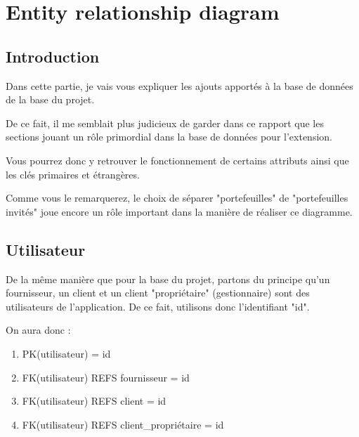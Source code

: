 \section{Entity relationship diagram}
\subsection{Introduction}
\begin{flushleft}
Dans cette partie, je vais vous expliquer les ajouts apportés à la base de données de la base du projet. 
\end{flushleft}
\begin{flushleft}
De ce fait, il me semblait plus judicieux de garder dans ce rapport que les sections jouant un rôle primordial dans la base de données pour l'extension.
\end{flushleft}
\begin{flushleft}
Vous pourrez donc y retrouver le fonctionnement de certains attributs ainsi que les clés primaires et étrangères.
\end{flushleft}
\begin{flushleft}
Comme vous le remarquerez, le choix de séparer "portefeuilles" de "portefeuilles invités" joue encore un rôle important dans la manière de réaliser ce diagramme.
\end{flushleft}

\subsection{Utilisateur}
\begin{flushleft}
De la même manière que pour la base du projet, partons du principe qu'un fournisseur, un client et un client "propriétaire" (gestionnaire) sont des utilisateurs de l'application.\newline
De ce fait, utilisons donc l'identifiant "id".
\end{flushleft}

\begin{flushleft}
On aura donc :
\end{flushleft}

\begin{enumerate}
\item PK(utilisateur) = id
\item FK(utilisateur) REFS fournisseur = id
\item FK(utilisateur) REFS client = id
\item FK(utilisateur) REFS client\_propriétaire = id
\end{enumerate}

